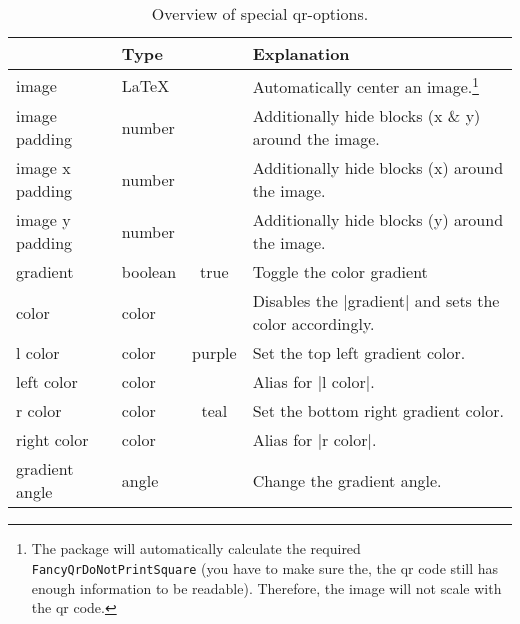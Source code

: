 \documentclass[parskip=half,english,numbers=noenddot,footnotes=nomultiple,oneside]{scrartcl}
\def\ltx#1{\lstinline/#1/}
\begin{document}
	\begin{savenotes}
	\begin{table}
		\centering\begin{tabular}{>{\ttfamily}ll>{\ttfamily}cp{.5\linewidth}}
			\toprule
			\multicolumn{1}{l}{Option} & Type & \multicolumn{1}{c}{Default} & Explanation \\
			\midrule
			image           & \LaTeX   &          & Automatically center an image.\footnote{The package will automatically calculate the required \ltx{\\FancyQrDoNotPrintSquare} (you have to make sure the, the qr code still has enough information to be readable). Therefore, the image will not scale with the qr code.} \\
			image padding   & number  &          & Additionally hide blocks (x \& y) around the image.          \\
			image x padding & number  &   0      & Additionally hide blocks (x) around the image.               \\
			image y padding & number  &   0      & Additionally hide blocks (y) around the image.               \\
			gradient        & boolean &   true   & Toggle the color gradient                                    \\
			color           & color   &          & Disables the |gradient| and sets the color accordingly.      \\
			l color         & color   & purple   & Set the top left gradient color.                             \\
			left color      & color   &          & Alias for |l color|.                                         \\
			r color         & color   &  teal    & Set the bottom right gradient color.                         \\
			right color     & color   &          & Alias for |r color|.                                         \\
			gradient angle  & angle   &  135     & Change the gradient angle.                                   \\
			\bottomrule
		\end{tabular}
		\caption{Overview of special qr-options.}
		\label{tbl:extra-keys}
	\end{table}
	\end{savenotes}
\end{document}
